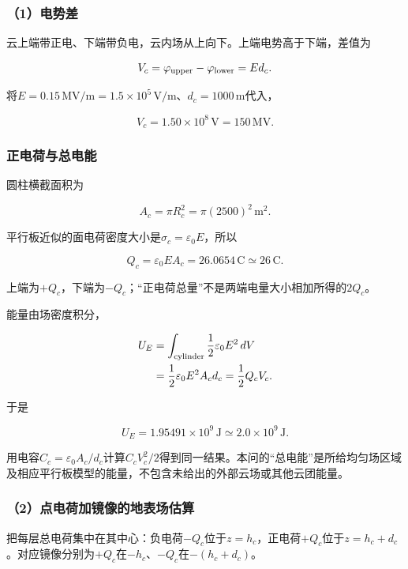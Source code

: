 \documentclass[12pt,a4paper,fontset=fandol]{ctexart}
\begin{document}
\subsubsection{（1）电势差}\label{ux7535ux52bfux5dee}

云上端带正电、下端带负电，云内场从上向下。上端电势高于下端，差值为

\[
V_c=\varphi_{\rm upper}-\varphi_{\rm lower}
=Ed_c.
\]

将\(E=0.15\,\mathrm{MV/m}=1.5\times10^5\,\mathrm{V/m}\)、\(d_c=1000\,\mathrm m\)代入，

\[
\boxed{V_c=1.50\times10^8\,\mathrm V=150\,\mathrm{MV}}.
\]

\subsubsection{正电荷与总电能}\label{ux6b63ux7535ux8377ux4e0eux603bux7535ux80fd}

圆柱横截面积为

\[
A_c=\pi R_c^2=\pi(2500)^2\,\mathrm{m^2}.
\]

平行板近似的面电荷密度大小是\(\sigma_c=\varepsilon_0E\)，所以

\[
\boxed{
Q_c=\varepsilon_0EA_c
=26.0654\,\mathrm C\simeq26\,\mathrm C}.
\]

上端为\(+Q_c\)，下端为\(-Q_c\)；``正电荷总量''不是两端电量大小相加所得的\(2Q_c\)。

能量由场密度积分，

\[
\begin{aligned}
U_E&=\int_{\rm cylinder}\frac12\varepsilon_0E^2\,dV\\
&=\frac12\varepsilon_0E^2A_cd_c
=\frac12Q_cV_c.
\end{aligned}
\]

于是

\[
\boxed{U_E=1.95491\times10^9\,\mathrm J
\simeq2.0\times10^9\,\mathrm J}.
\]

用电容\(C_c=\varepsilon_0A_c/d_c\)计算\(C_cV_c^2/2\)得到同一结果。本问的``总电能''是所给均匀场区域及相应平行板模型的能量，不包含未给出的外部云场或其他云团能量。

\subsubsection{（2）点电荷加镜像的地表场估算}\label{ux70b9ux7535ux8377ux52a0ux955cux50cfux7684ux5730ux8868ux573aux4f30ux7b97}

把每层总电荷集中在其中心：负电荷\(-Q_c\)位于\(z=h_c\)，正电荷\(+Q_c\)位于\(z=h_c+d_c\)。对应镜像分别为\(+Q_c\)在\(-h_c\)、\(-Q_c\)在\(-(h_c+d_c)\)。
\end{document}
